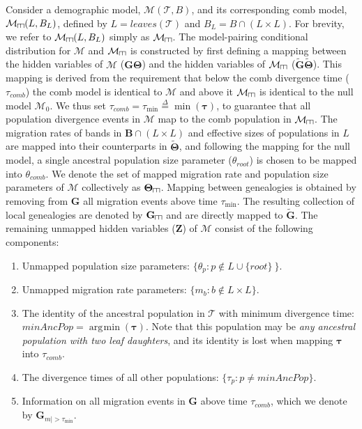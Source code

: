 \documentclass[11pt]{article}
\newcommand{\vect}[1]{\boldsymbol{\mathbf{#1}}}
\newcommand{\M}{\mathcal{M}}
\newcommand{\Tr}{\mathcal{T}}
\newcommand{\B}{\vect{B}}
\newcommand{\G}{\vect{G}}
\newcommand{\T}{\vect{\Theta}}
\newcommand{\GT}{\G\T}
\newcommand{\Gref}{\widetilde{\G}}
\newcommand{\Tref}{\widetilde{\T}}
\newcommand{\1}{\mathbbm{1}}
\newcommand{\Z}{\vect{Z}}
\newcommand{\troot}{\theta_{root}}
\def\comb{\rotatebox[origin=c]{90}{$\exists$}}
\newcommand{\Mcomb}{\M_{\comb}}
\newcommand{\Gcomb}{\G_{\comb}}
\newcommand{\Tcomb}{\T_{\comb}}
\newcommand{\tmin}{\tau_{\text{min}}}
\newcommand{\eqdef}{\stackrel{\Delta}{=}}
\DeclareMathOperator*{\argmin}{\arg\!\min}
\newcommand{\taus}{\vect\tau}
\newcommand{\thcomb}{\theta_{comb}}
\newcommand{\tacomb}{\tau_{comb}}
\def\comb{\rotatebox[origin=c]{90}{$\exists$}}
\begin{document}
%
Consider a demographic model, $\M(\Tr,B)$, and its corresponding comb model, $\Mcomb(L,B_L)$, defined by $L=leaves(\Tr)$ and $B_L=B \cap (L \times L)$.
%
For brevity, we refer to $\Mcomb(L,B_L)$ simply as $\Mcomb$.
%
The model-pairing conditional distribution for $\M$ and $\Mcomb$ is constructed by first defining a mapping between the hidden variables of $\M$ ($\GT$) and the hidden variables of $\Mcomb$ ($\Gref\Tref$).
%
This mapping is derived from the requirement that below the comb divergence time ($\tacomb$) the comb model is identical to $\M$ and above it $\Mcomb$ is identical to the null model $\M_0$.
%
We thus set $\tacomb=\tmin\eqdef\min(\taus)$, to guarantee that all population divergence events in $\M$ map to the comb population in $\Mcomb$.
%
The migration rates of bands in $\B \cap (L \times L)$ and effective sizes of populations in $L$ are mapped into their counterparts in $\Tref$,
%
and following the mapping for the null model, a single ancestral population size parameter ($\troot$) is chosen to be mapped into $\thcomb$.
%
We denote the set of mapped migration rate and population size parameters of $\M$ collectively as $\Tcomb$.
%
Mapping between genealogies is obtained by {removing from $\G$ all migration events above time $\tmin$}.
The resulting collection of local genealogies are denoted by $\Gcomb$ and are directly mapped to $\Gref$.
%
The remaining unmapped hidden variables ($\Z$) of $\M$ consist of the following components:
\begin{enumerate}
 \item Unmapped population size parameters: $\{\theta_p : p\notin L\cup \{root\}\ \}$.
 \item Unmapped migration rate parameters:  $\{m_b: b\notin L \times L \}$.
 \item The identity of the ancestral population in $\Tr$ with minimum divergence time: $minAncPop=\argmin(\taus)$. 
   Note that this population may be \emph{any ancestral population with two leaf daughters}, and its identity is lost when mapping $\taus$ into $\tacomb$.
 \item The divergence times of all other populations: $\{\tau_p:p\neq minAncPop\}$.
 \item Information on all migration events in $\G$ above time $\tacomb$, which we denote by $\G_{m|>\tmin}$.
\end{enumerate}
\end{document}
